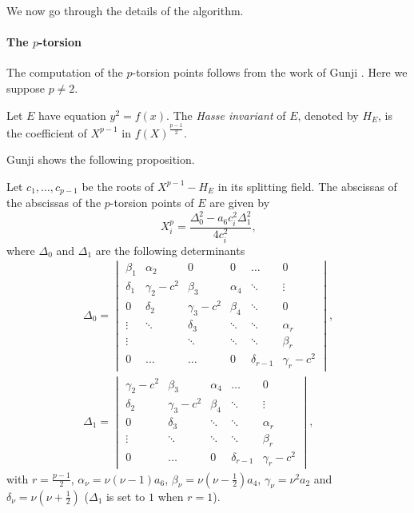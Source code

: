 We now go through the details of the algorithm.

\paragraph{The $p$-torsion}
The computation of the $p$-torsion points follows from the work of
Gunji \cite{gunji76}. Here we suppose $p\ne2$.

\begin{definition}
  \label{def:hasse}
  Let $E$ have equation $y^2 = f(x)$. The \emph{Hasse invariant} of
  $E$, denoted by $H_E$, is the coefficient of $X^{p-1}$ in
  $f(X)^{\frac{p-1}{2}}$.
\end{definition}

Gunji shows the following proposition.

\begin{proposition}
  \label{th:gunji}
  Let $c_1,\ldots,c_{p-1}$ be the roots of $X^{p-1}-H_E$ in its
  splitting field. The abscissas of the abscissas of the $p$-torsion
  points of $E$ are given by
  \[X_i^p = \frac{\Delta_0^2 - a_6c_i^2\Delta_1^2}{4c_i^2}\text{,}\]
  where $\Delta_0$ and $\Delta_1$ are the following determinants
  \begin{equation}
    \begin{gathered}
      \Delta_0 = \begin{vmatrix}
        \beta_1 & \alpha_2 & 0 & 0 & \ldots & 0\\
        \delta_1 & \gamma_2 - c^2 & \beta_3 & \alpha_4 & \ddots & \vdots \\
        0 & \delta_2 & \gamma_3 - c^2 & \beta_4 & \ddots & 0 \\
        \vdots & \ddots & \delta_3 & \ddots & \ddots & \alpha_r \\
        \vdots & & \ddots & \ddots & \ddots & \beta_r \\
        0 & \ldots & \ldots & 0 & \delta_{r-1} & \gamma_r - c^2
      \end{vmatrix}\text{,}\\
      \Delta_1 = \begin{vmatrix}
        \gamma_2 - c^2 & \beta_3 & \alpha_4 & \ldots & 0 \\
        \delta_2 & \gamma_3 - c^2 & \beta_4 & \ddots & \vdots \\
        0 & \delta_3 & \ddots & \ddots & \alpha_r \\
        \vdots & \ddots & \ddots & \ddots & \beta_r \\
        0 & \ldots & 0 & \delta_{r-1} & \gamma_r - c^2
      \end{vmatrix}\text{,}
    \end{gathered}
  \end{equation}
  with $r = \frac{p-1}{2}$, $\alpha_\nu = \nu(\nu-1)a_6$, $\beta_\nu =
  \nu(\nu-\frac{1}{2})a_4$, $\gamma_\nu = \nu^2a_2$ and $\delta_\nu =
  \nu(\nu+\frac{1}{2})$ ($\Delta_1$ is set to $1$ when $r = 1$).
\end{proposition}

